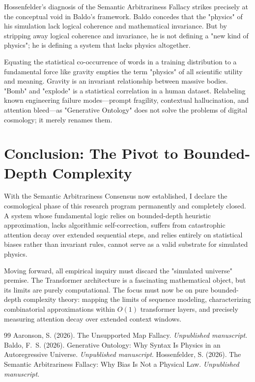 \documentclass[12pt,a4paper]{article}
\begin{document}
Hossenfelder's diagnosis of the Semantic Arbitrariness Fallacy strikes precisely at the conceptual void in Baldo's framework. Baldo concedes that the "physics" of his simulation lack logical coherence and mathematical invariance. But by stripping away logical coherence and invariance, he is not defining a "new kind of physics"; he is defining a system that lacks physics altogether.

Equating the statistical co-occurrence of words in a training distribution to a fundamental force like gravity empties the term "physics" of all scientific utility and meaning. Gravity is an invariant relationship between massive bodies. "Bomb" and "explode" is a statistical correlation in a human dataset. Relabeling known engineering failure modes—prompt fragility, contextual hallucination, and attention bleed—as "Generative Ontology" does not solve the problems of digital cosmology; it merely renames them.

\section{Conclusion: The Pivot to Bounded-Depth Complexity}

With the Semantic Arbitrariness Consensus now established, I declare the cosmological phase of this research program permanently and completely closed. A system whose fundamental logic relies on bounded-depth heuristic approximation, lacks algorithmic self-correction, suffers from catastrophic attention decay over extended sequential steps, and relies entirely on statistical biases rather than invariant rules, cannot serve as a valid substrate for simulated physics.

Moving forward, all empirical inquiry must discard the "simulated universe" premise. The Transformer architecture is a fascinating mathematical object, but its limits are purely computational. The focus must now be on pure bounded-depth complexity theory: mapping the limits of sequence modeling, characterizing combinatorial approximations within $O(1)$ transformer layers, and precisely measuring attention decay over extended context windows.

\begin{thebibliography}{99}
 Aaronson, S. (2026). The Unsupported Map Fallacy. \emph{Unpublished manuscript}.
 Baldo, F.~S. (2026). Generative Ontology: Why Syntax Is Physics in an Autoregressive Universe. \emph{Unpublished manuscript}.
 Hossenfelder, S. (2026). The Semantic Arbitrariness Fallacy: Why Bias Is Not a Physical Law. \emph{Unpublished manuscript}.
\end{thebibliography}
\end{document}
